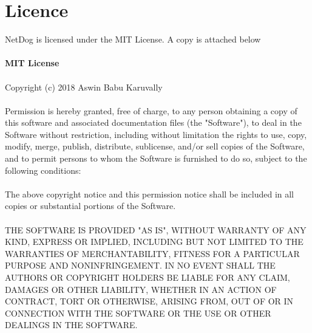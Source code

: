 \newpage 

\section{Licence}
NetDog is licensed under the MIT License. A copy is attached below\\\\
\textbf{MIT License}\\\\
Copyright (c) 2018 Aswin Babu Karuvally\\\\
Permission is hereby granted, free of charge, to any person obtaining a copy
of this software and associated documentation files (the "Software"), to deal
in the Software without restriction, including without limitation the rights
to use, copy, modify, merge, publish, distribute, sublicense, and/or sell
copies of the Software, and to permit persons to whom the Software is
furnished to do so, subject to the following conditions:\\\\
The above copyright notice and this permission notice shall be included in all
copies or substantial portions of the Software.\\\\
THE SOFTWARE IS PROVIDED "AS IS", WITHOUT WARRANTY OF ANY KIND, EXPRESS OR
IMPLIED, INCLUDING BUT NOT LIMITED TO THE WARRANTIES OF MERCHANTABILITY,
FITNESS FOR A PARTICULAR PURPOSE AND NONINFRINGEMENT. IN NO EVENT SHALL THE 
AUTHORS OR COPYRIGHT HOLDERS BE LIABLE FOR ANY CLAIM, DAMAGES OR OTHER
LIABILITY, WHETHER IN AN ACTION OF CONTRACT, TORT OR OTHERWISE, ARISING FROM,
OUT OF OR IN CONNECTION WITH THE SOFTWARE OR THE USE OR OTHER DEALINGS IN THE 
SOFTWARE.

